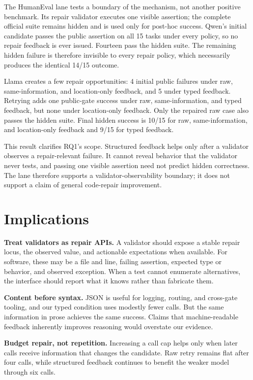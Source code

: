 \documentclass[sigconf,review,anonymous]{acmart}
\begin{document}
The HumanEval lane tests a boundary of the mechanism, not another positive
benchmark. Its repair validator executes one visible assertion; the complete
official suite remains hidden and is used only for post-hoc success. Qwen's
initial candidate passes the public assertion on all 15 tasks under every
policy, so no repair feedback is ever issued. Fourteen pass the hidden suite.
The remaining hidden failure is therefore invisible to every repair policy,
which necessarily produces the identical 14/15 outcome.

Llama creates a few repair opportunities: 4 initial public failures under raw,
same-information, and location-only feedback, and 5 under typed feedback.
Retrying adds one public-gate success under raw, same-information, and typed
feedback, but none under location-only feedback. Only the repaired raw case also
passes the hidden suite. Final hidden success is 10/15 for raw,
same-information, and location-only feedback and 9/15 for typed feedback.

This result clarifies RQ1's scope. Structured feedback helps only after a
validator observes a repair-relevant failure. It cannot reveal behavior that
the validator never tests, and passing one visible assertion need not predict
hidden correctness. The lane therefore supports a validator-observability
boundary; it does not support a claim of general code-repair improvement.

\section{Implications}

\textbf{Treat validators as repair APIs.} A validator should expose a stable
repair locus, the observed value, and actionable expectations when available.
For software, these may be a file and line, failing assertion, expected type or
behavior, and observed exception. When a test cannot enumerate alternatives,
the interface should report what it knows rather than fabricate them.

\textbf{Content before syntax.} JSON is useful for logging, routing, and
cross-gate tooling, and our typed condition uses modestly fewer calls. But the
same information in prose achieves the same success. Claims that
machine-readable feedback inherently improves reasoning would overstate our
evidence.

\textbf{Budget repair, not repetition.} Increasing a call cap helps only when
later calls receive information that changes the candidate. Raw retry remains
flat after four calls, while structured feedback continues to benefit the
weaker model through six calls.
\end{document}
